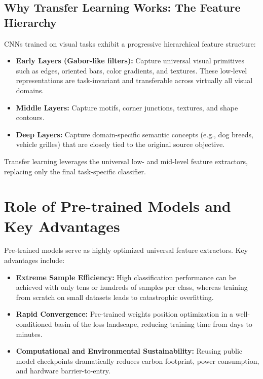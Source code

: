 \documentclass[12pt,a4paper]{article}
\begin{document}
\subsection{Why Transfer Learning Works: The Feature Hierarchy}
CNNs trained on visual tasks exhibit a progressive hierarchical feature structure:
\begin{itemize}[leftmargin=*]
\item \textbf{Early Layers (Gabor-like filters):} Capture universal visual primitives such as edges, oriented bars, color gradients, and textures. These low-level representations are task-invariant and transferable across virtually all visual domains.
\item \textbf{Middle Layers:} Capture motifs, corner junctions, textures, and shape contours.
\item \textbf{Deep Layers:} Capture domain-specific semantic concepts (e.g., dog breeds, vehicle grilles) that are closely tied to the original source objective.
\end{itemize}
Transfer learning leverages the universal low- and mid-level feature extractors, replacing only the final task-specific classifier.

\section{Role of Pre-trained Models and Key Advantages}
Pre-trained models serve as highly optimized universal feature extractors. Key advantages include:
\begin{itemize}[leftmargin=*]
\item \textbf{Extreme Sample Efficiency:} High classification performance can be achieved with only tens or hundreds of samples per class, whereas training from scratch on small datasets leads to catastrophic overfitting.
\item \textbf{Rapid Convergence:} Pre-trained weights position optimization in a well-conditioned basin of the loss landscape, reducing training time from days to minutes.
\item \textbf{Computational and Environmental Sustainability:} Reusing public model checkpoints dramatically reduces carbon footprint, power consumption, and hardware barrier-to-entry.
\end{itemize}
\end{document}
